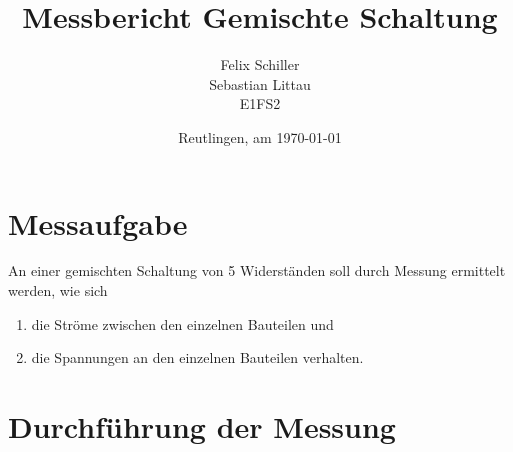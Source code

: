 \documentclass[
a4paper,     %
 headsepline, %
11pt         %
]{scrartcl}  %
\title{Messbericht Gemischte Schaltung}
\author{Felix Schiller \\ Sebastian Littau \\ E1FS2}
\date{Reutlingen, am \today{}}
\begin{document}

\maketitle

\newpage
\tableofcontents





\section{Messaufgabe}
An einer gemischten Schaltung von 5 Widerständen soll durch Messung ermittelt werden, wie sich 
\begin{enumerate}
	\item die Ströme zwischen den einzelnen Bauteilen und 
	\item die Spannungen an den einzelnen Bauteilen verhalten. 
\end{enumerate}


\section{Durchführung der Messung}
\end{document}
